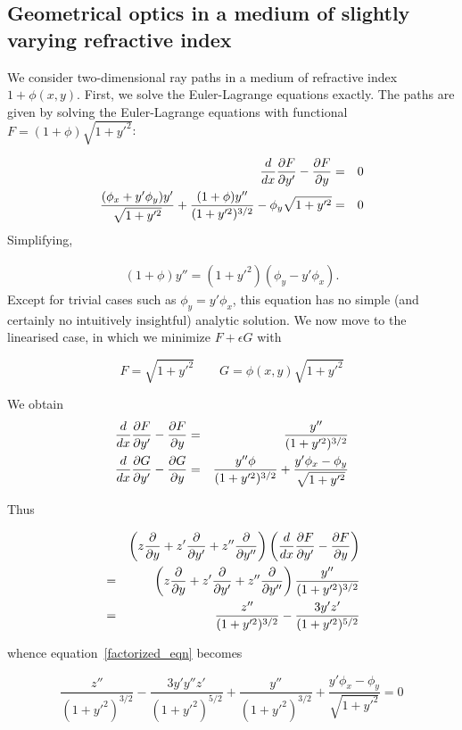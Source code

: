 \documentclass[pdflatex,sn-mathphys-num]{sn-jnl}%
\theoremstyle{thmstyleone}%
\theoremstyle{thmstyletwo}%
\theoremstyle{thmstylethree}%
\begin{document}
\subsection{Geometrical optics in a medium of slightly varying refractive index}

We consider two-dimensional ray paths in a medium of refractive index
$1+\phi(x,y)$.  First, we solve the Euler-Lagrange equations exactly.
The paths are given by solving the Euler-Lagrange equations with
functional $F=(1+\phi)\sqrt{1+y'^2}$:

\begin{eqnarray}
  \frac{d}{dx}\frac{\partial{F}}{\partial{y'}}-\frac{\partial{F}}{\partial{y}} &=& 0\nonumber\\
  \frac{(\phi_x+y'\phi_y)y'}{\sqrt{1+y'^2}}+\frac{(1+\phi)y''}{(1+y'^2)^{3/2}} -
  \phi_y\sqrt{1+y'^2} &=& 0
\end{eqnarray}
%
Simplifying,

\begin{eqnarray}\label{full_RI}
 (1+\phi) y'' = (1+y'^2)(\phi_y - y'\phi_x).
\end{eqnarray}
%
Except for trivial cases such as $\phi_y=y'\phi_x$, this equation has
no simple (and certainly no intuitively insightful) analytic solution.
We now move to the linearised case, in which we minimize $F+\epsilon G$ with

\begin{equation}F=\sqrt{1+y'^2}\qquad
  G=\phi(x,y)\sqrt{1+y'^2}
\end{equation}

We obtain
\begin{eqnarray}
  \frac{d}{dx}\frac{\partial{F}}{\partial{y'}} - \frac{\partial{F}}{\partial{y}} &=& \frac{y''}{(1+y'^2)^{3/2}}\nonumber\\
  \frac{d}{dx}\frac{\partial{G}}{\partial{y'}} - \frac{\partial{G}}{\partial{y}} &=& \frac{y''\phi}{(1+y'^2)^{3/2}} + \frac{y'\phi_x - \phi_y}{\sqrt{1+y'^2}}
\end{eqnarray}

Thus

\begin{eqnarray}
&{}& \left(z\frac{\partial{}}{\partial{y}} + z'\frac{\partial{}}{\partial{y'}} + z''\frac{\partial{}}{\partial{y''}}\right)\left(\frac{d}{dx}\frac{\partial{F}}{\partial{y'}} - \frac{\partial{F}}{\partial{y}}\right)\nonumber\\
&=&  \left(z\frac{\partial{}}{\partial{y}} + z'\frac{\partial{}}{\partial{y'}} + z''\frac{\partial{}}{\partial{y''}}\right)\frac{y''}{(1+y'^2)^{3/2}}\nonumber\\
&=&  \frac{z''}{(1+y'^2)^{3/2}} - \frac{3y'z'}{(1+y'^2)^{5/2}}
\end{eqnarray}

whence equation~\ref{factorized_eqn} becomes

\begin{equation}
    \frac{z''}{(1+y'^2)^{3/2}}
  - \frac{3y'y''z'}{(1+y'^2)^{5/2}} + 
  \frac{y''}{(1+y'^2)^{3/2}}
  + \frac{y'\phi_x - \phi_y}{\sqrt{1+y'^2}}=0
\end{equation}
\end{document}
